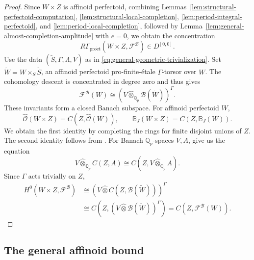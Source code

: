 \documentclass[11pt]{article}
\theoremstyle{definition}
\newcommand{\Qp}{\mathbb Q_p}
\newcommand{\proet}{\mathrm{pro\acute et}}
\begin{document}
\begin{proof}
Since \(W\times Z\) is affinoid perfectoid, combining
Lemmas~\ref{lem:structural-perfectoid-computation},
\ref{lem:structural-local-completion},
\ref{lem:period-integral-perfectoid}, and
\ref{lem:period-local-completion}, followed by
Lemma~\ref{lem:general-almost-completion-amplitude} with \(e=0\), we obtain the concentration
\[
 R\Gamma_{\proet}(W\times Z,\mathcal F^{\mathscr B})
 \in D^{[0,0]}.
\]
Use the data
\((\widetilde{S},\Gamma,\Lambda,V)\) as in
\eqref{eq:general-geometric-trivialization}.
Set \(\widetilde{W}=W\times_S\widetilde{S}\), an affinoid perfectoid
pro-finite-\'etale \(\Gamma\)-torsor over $W$. The cohomology descent is concentrated in degree zero 
and thus gives
\[
 \mathcal F^{\mathscr B}(W)
 \cong\left(V\widehat\otimes_{\Qp}\mathscr B(\widetilde{W})\right)^\Gamma.
\]
These invariants form a closed Banach subspace.
For affinoid perfectoid \(W\),
\[
 \widehat{\mathscr O}(W\times Z)
 =C(Z,\widehat{\mathscr O}(W)),\qquad
 \mathbb B_J(W\times Z)=C(Z,\mathbb B_J(W)).
\]
We obtain the first identity by completing the rings for
finite disjoint unions of \(Z\). The second identity follows from
\cite[Corollary~4.10]{BoscoDrinfeld}.
For Banach \(\Qp\)-spaces \(V,A\),
\cite[Proposition~A.55(i), Corollary~A.61, and
Proposition~A.68]{BoscoDrinfeld} give us the equation
\[
 V\widehat\otimes_{\Qp}C(Z,A)
 \cong C(Z,V\widehat\otimes_{\Qp}A).
\]
Since \(\Gamma\) acts trivially on \(Z\),
\begin{align*}
 H^0(W\times Z,\mathcal F^{\mathscr B})
 &\cong
 \left(V\widehat\otimes C(Z,\mathscr B(\widetilde{W}))\right)^\Gamma\\
 &\cong
 C\!\left(Z,
   \left(V\widehat\otimes\mathscr B(\widetilde{W})\right)^\Gamma\right)
 =C(Z,\mathcal F^{\mathscr B}(W)).
\end{align*}
\end{proof}

\subsection{The general affinoid bound}
\label{subsec:general-affinoid-bound}
\end{document}
